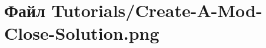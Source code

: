 \hypertarget{_create-_a-_mod-_close-_solution_8png}{}\section{Файл Tutorials/\+Create-\/\+A-\/\+Mod-\/\+Close-\/\+Solution.png}
\label{_create-_a-_mod-_close-_solution_8png}
